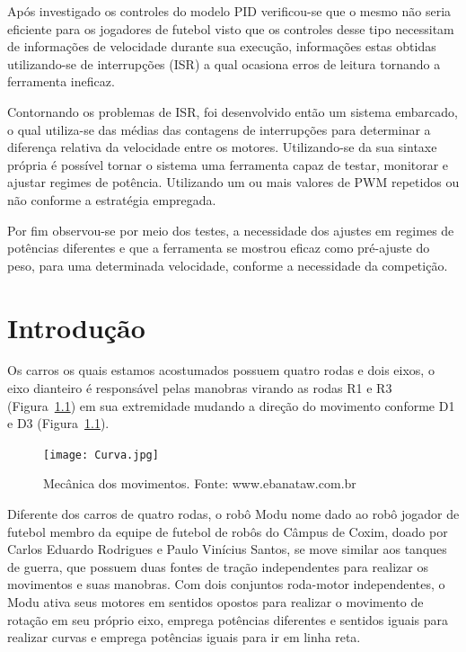\documentclass[a4paper,12pt,portuguese]{ufms-cpcx}
\begin{document}
Após investigado os controles do modelo PID verificou-se que o mesmo não seria eficiente para os jogadores de futebol visto que os controles desse tipo necessitam de informações de velocidade durante sua execução, informações estas obtidas utilizando-se de interrupções (ISR) a qual ocasiona erros de leitura tornando a ferramenta ineficaz.

Contornando os problemas de ISR, foi desenvolvido então um sistema embarcado, o qual utiliza-se das médias das contagens de interrupções para determinar a diferença relativa da velocidade entre os motores. Utilizando-se da sua sintaxe própria é possível tornar o sistema uma ferramenta capaz de testar, monitorar e ajustar regimes de potência. Utilizando um ou mais valores de PWM repetidos ou não conforme a estratégia empregada.

Por fim observou-se por meio dos testes, a necessidade dos ajustes em regimes de potências diferentes e que a ferramenta se mostrou eficaz como pré-ajuste do peso, para uma determinada velocidade, conforme a necessidade da competição.




\cleardoublepage
{}
\setcounter{page}{1}
\tableofcontents

\cleardoublepage
{}
\listoffigures

\cleardoublepage
{}
\listoftables

\cleardoublepage
{}
\setcounter{page}{1}

\chapter{Introdução}
Os carros os quais estamos acostumados possuem quatro rodas e dois eixos, o eixo dianteiro é responsável pelas manobras virando as rodas R1 e R3 (Figura~\ref{fig:carrocurva}) em sua extremidade mudando a direção do movimento conforme D1 e D3 (Figura~\ref{fig:carrocurva}).
\begin{figure}[H]
	\centering
	\texttt{[image: Curva.jpg]}
	\caption{Mecânica dos movimentos. Fonte: www.ebanataw.com.br}
	\label{fig:carrocurva}
\end{figure}
Diferente dos carros de quatro rodas, o robô Modu nome dado ao robô jogador de futebol membro da equipe de futebol de robôs do Câmpus de Coxim, doado por Carlos Eduardo Rodrigues e Paulo Vinícius Santos, se move similar aos tanques de guerra, que possuem duas fontes de tração independentes para realizar os movimentos e suas manobras.
Com dois conjuntos roda-motor independentes, o Modu ativa seus motores em sentidos opostos para realizar o movimento de rotação em seu próprio eixo, emprega potências diferentes e sentidos iguais para realizar curvas e emprega potências iguais para ir em linha reta. 
\end{document}
